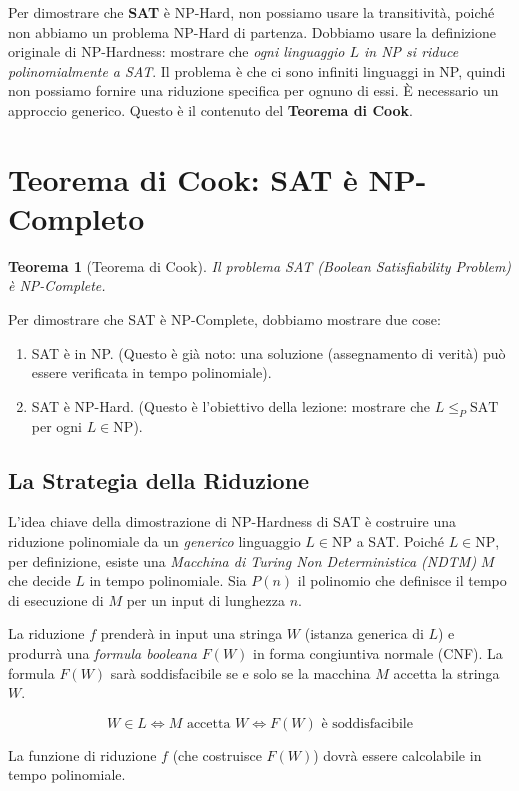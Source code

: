 \documentclass[a4paper, 11pt]{book} %
\newtheorem{theorem}{Teorema}[section]
\theoremstyle{definition}
\begin{document}
Per dimostrare che \textbf{SAT} è NP-Hard, non possiamo usare la transitività, poiché non abbiamo un problema NP-Hard di partenza. Dobbiamo usare la definizione originale di NP-Hardness: mostrare che \emph{ogni linguaggio $L$ in NP si riduce polinomialmente a SAT}.
Il problema è che ci sono infiniti linguaggi in NP, quindi non possiamo fornire una riduzione specifica per ognuno di essi. È necessario un approccio generico. Questo è il contenuto del \textbf{Teorema di Cook}.

\section{Teorema di Cook: SAT è NP-Completo}

\begin{theorem}[Teorema di Cook]
Il problema SAT (Boolean Satisfiability Problem) è NP-Complete.
\end{theorem}

Per dimostrare che SAT è NP-Complete, dobbiamo mostrare due cose:
\begin{enumerate}
    \item SAT è in NP. (Questo è già noto: una soluzione (assegnamento di verità) può essere verificata in tempo polinomiale).
    \item SAT è NP-Hard. (Questo è l'obiettivo della lezione: mostrare che $L \le_P \text{SAT}$ per ogni $L \in \text{NP}$).
\end{enumerate}

\subsection{La Strategia della Riduzione}
L'idea chiave della dimostrazione di NP-Hardness di SAT è costruire una riduzione polinomiale da un \emph{generico} linguaggio $L \in \text{NP}$ a SAT.
Poiché $L \in \text{NP}$, per definizione, esiste una \emph{Macchina di Turing Non Deterministica (NDTM)} $M$ che decide $L$ in tempo polinomiale. Sia $P(n)$ il polinomio che definisce il tempo di esecuzione di $M$ per un input di lunghezza $n$.

La riduzione $f$ prenderà in input una stringa $W$ (istanza generica di $L$) e produrrà una \emph{formula booleana} $F(W)$ in forma congiuntiva normale (CNF). La formula $F(W)$ sarà soddisfacibile se e solo se la macchina $M$ accetta la stringa $W$.

\[ W \in L \iff M \text{ accetta } W \iff F(W) \text{ è soddisfacibile} \]

La funzione di riduzione $f$ (che costruisce $F(W)$) dovrà essere calcolabile in tempo polinomiale.
\end{document}
